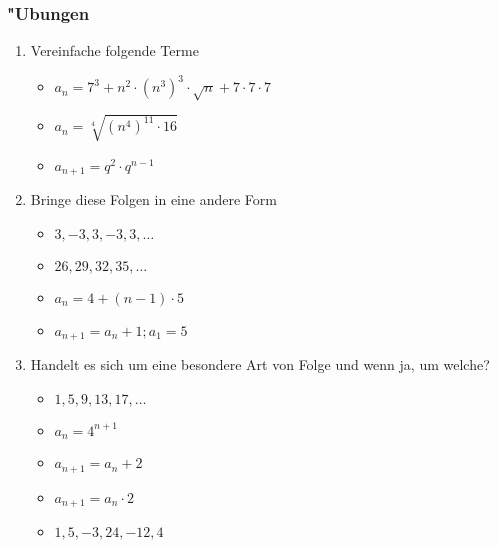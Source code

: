 \subsubsection{"Ubungen}
\begin{enumerate}
\item Vereinfache folgende Terme
\begin{itemize}
\item $ a_n = 7^3 + n^2 \cdot (n^3)^3 \cdot \sqrt{n} + 7 \cdot 7 \cdot 7 $
\item $ a_n = \sqrt[4]{(n^4)^{11} \cdot 16} $
\item $ a_{n+1} = q^2 \cdot q^{n-1} $
\end{itemize}
\item Bringe diese Folgen in eine andere Form
\begin{itemize}
\item $3,-3,3,-3,3,\ldots$
\item $26,29,32,35,\ldots$
\item $a_n = 4 + (n-1) \cdot 5$
\item $a_{n+1} = a_n + 1; a_1 = 5$
\end{itemize}
\item Handelt es sich um eine besondere Art von Folge und wenn ja, um welche?
\begin{itemize}
\item $1,5,9,13,17,\ldots$
\item $a_n = 4^{n+1}$
\item $a_{n+1} = a_n + 2$
\item $a_{n+1} = a_n \cdot 2$
\item $1,5,-3,24,-12,4$
\end{itemize}
\end{enumerate}